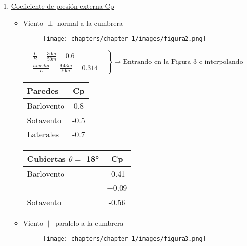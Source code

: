 \begin{enumerate}
\item \underline{Coeficiente de presión externa Cp}\\
\begin{itemize}
\item Viento $\perp$ normal a la cumbrera
\begin{figure}[H]
\begin{center}
     \texttt{[image: chapters/chapter\_1/images/figura2.png]}
\end{center}
\end{figure}

\[\left. \begin{array}{ll}
         \frac{L}{B}=\frac{30m}{50m}=0.6 & \\
         \frac{hmedia}{L}=\frac{9.43m}{30m}=0.314 & \end{array} \right\} \Rightarrow \text{Entrando en la Figura 3 e interpolando} \] 

\begin{table}[H]
  \begin{center}
    \begin{tabular}{l|c} %
      Paredes & Cp \\
      \hline
      Barlovento & 0.8 \\
      Sotavento & -0.5 \\
      Laterales & -0.7 \\
    \end{tabular}
  \end{center}
\end{table}


\begin{table}[H]
  \begin{center}
    \begin{tabular}{l|c} %
      Cubiertas $\theta =$ 18°& Cp \\
      \hline
      Barlovento & -0.41 \\
     			 & +0.09 \\ \hline
      Sotavento  & -0.56 \\
    \end{tabular}
  \end{center}
\end{table}

\item Viento $\parallel$ paralelo a la cumbrera
\begin{figure}[H]
\begin{center}
     \texttt{[image: chapters/chapter\_1/images/figura3.png]}
\end{center}
\end{figure}


\end{itemize}
\end{enumerate}
